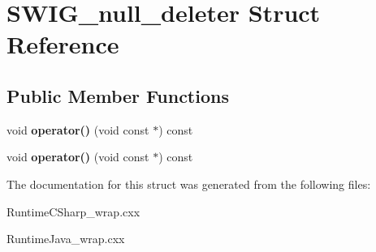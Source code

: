 \hypertarget{struct_s_w_i_g__null__deleter}{}\section{S\+W\+I\+G\+\_\+null\+\_\+deleter Struct Reference}
\label{struct_s_w_i_g__null__deleter}
\subsection*{Public Member Functions}
\begin{DoxyCompactItemize}
\item 
void {\bfseries operator()} (void const $\ast$) const \hypertarget{struct_s_w_i_g__null__deleter_aa95dacef916da5f0a455c37edaf8aefc}{}\label{struct_s_w_i_g__null__deleter_aa95dacef916da5f0a455c37edaf8aefc}

\item 
void {\bfseries operator()} (void const $\ast$) const \hypertarget{struct_s_w_i_g__null__deleter_aa95dacef916da5f0a455c37edaf8aefc}{}\label{struct_s_w_i_g__null__deleter_aa95dacef916da5f0a455c37edaf8aefc}

\end{DoxyCompactItemize}


The documentation for this struct was generated from the following files\+:\begin{DoxyCompactItemize}
\item 
Runtime\+C\+Sharp\+\_\+wrap.\+cxx\item 
Runtime\+Java\+\_\+wrap.\+cxx\end{DoxyCompactItemize}
